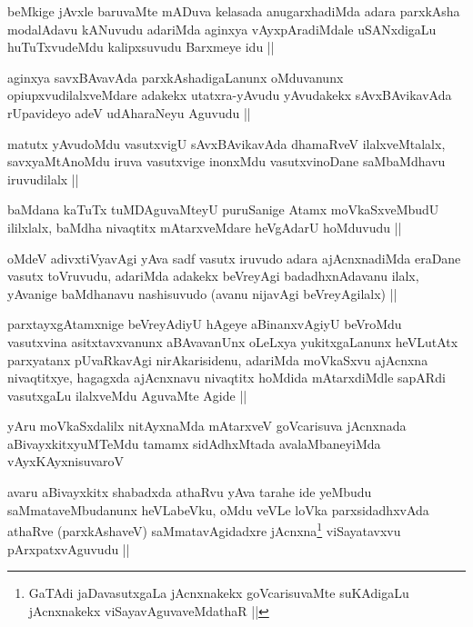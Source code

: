 \begin{artha}
beMkige jAvxle baruvaMte mADuva kelasada anugarxhadiMda adara
parxkAsha modalAdavu kANuvudu adariMda aginxya vAyxpAradiMdale
uSANxdigaLu huTuTxvudeMdu kalipxsuvudu Barxmeye idu ||
\end{artha}

\begin{artha}
aginxya savxBAvavAda parxkAshadigaLanunx oMduvanunx
opiupxvudilalxveMdare adakekx utatxra-yAvudu yAvudakekx sAvxBAvikavAda
rUpavideyo adeV udAharaNeyu Aguvudu ||
\end{artha}

\begin{artha}
matutx yAvudoMdu vasutxvigU sAvxBAvikavAda dhamaRveV ilalxveMtalalx,
savxyaMtAnoMdu iruva vasutxvige inonxMdu vasutxvinoDane saMbaMdhavu
iruvudilalx ||
\end{artha}

\begin{artha}
baMdana kaTuTx tuMDAguvaMteyU puruSanige Atamx moVkaSxveMbudU
ililxlalx, baMdha nivaqtitx mAtarxveMdare heVgAdarU hoMduvudu ||
\end{artha}

\begin{artha}
oMdeV adivxtiVyavAgi yAva sadf vasutx iruvudo adara ajAcnxnadiMda
eraDane vasutx toVruvudu, adariMda adakekx beVreyAgi badadhxnAdavanu
ilalx, yAvanige baMdhanavu nashisuvudo (avanu nijavAgi beVreyAgilalx) ||
\end{artha}


\begin{artha}
parxtayxgAtamxnige beVreyAdiyU hAgeye aBinanxvAgiyU beVroMdu
vasutxvina asitxtavxvanunx aBAvavanUnx oLeLxya yukitxgaLanunx
heVLutAtx parxyatanx pUvaRkavAgi nirAkarisidenu, adariMda moVkaSxvu
ajAcnxna nivaqtitxye, hagagxda ajAcnxnavu nivaqtitx hoMdida
mAtarxdiMdle sapARdi vasutxgaLu ilalxveMdu AguvaMte Agide ||
\end{artha}


\begin{artha}
yAru moVkaSxdalilx nitAyxnaMda mAtarxveV goVcarisuva jAcnxnada
aBivayxkitxyuMTeMdu tamamx sidAdhxMtada avalaMbaneyiMda vAyxKAyxnisuvaroV
\end{artha}

\begin{artha}
avaru aBivayxkitx shabadxda athaRvu yAva tarahe ide yeMbudu
saMmataveMbudanunx heVLabeVku, oMdu veVLe loVka parxsidadhxvAda
athaRve (parxkAshaveV) saMmatavAgidadxre jAcnxna\footnote{GaTAdi
  jaDavasutxgaLa jAcnxnakekx goVcarisuvaMte suKAdigaLu jAcnxnakekx
  viSayavAguvaveMdathaR ||}
viSayatavxvu pArxpatxvAguvudu ||
\end{artha}

